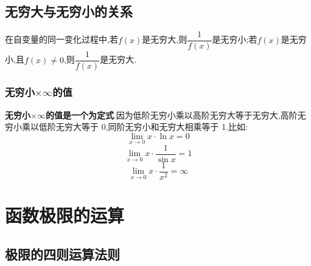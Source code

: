\documentclass[8pt a4paper, oneside, UTF8]{ctexbook}
\begin{document}
\begin{sloppypar}
    \subsection{无穷大与无穷小的关系}
    在自变量的同一变化过程中,若$f(x)$是无穷大,则$\dfrac{1}{f(x)}$是无穷小;若$f(x)$是无穷小,且$f(x)\neq 0$,则$\dfrac{1}{f(x)}$是无穷大.
    \subsubsection{无穷小$\times \infty$的值}
    \textbf{无穷小$\times \infty$的值是一个为定式}.因为低阶无穷小乘以高阶无穷大等于无穷大,高阶无穷小乘以低阶无穷大等于 0,同阶无穷小和无穷大相乘等于 1.比如:
    $$
        \lim_{x\to0}x\cdot \ln x=0 
    $$
    $$
        \lim_{x\to0}x\cdot\dfrac1{\sin x}=1 
    $$
    $$
        \lim_{x\to0}x\cdot\dfrac1{x^2}=\infty 
    $$
    \section{函数极限的运算}
    \subsection{极限的四则运算法则}\label{jxdsz1}

\end{sloppypar}
\end{document}
